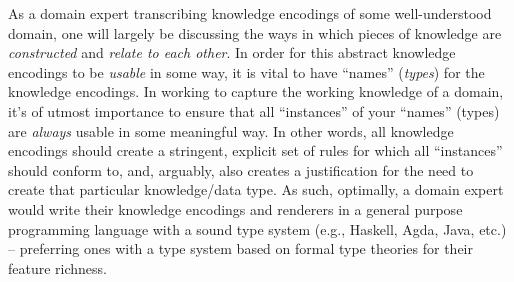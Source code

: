 
As a domain expert transcribing knowledge encodings of some well-understood
domain, one will largely be discussing the ways in which pieces of knowledge are
\textit{constructed} and \textit{relate to each other}. In order for this
abstract knowledge encodings to be \textit{usable} in some way, it is vital to
have ``names'' (\textit{types}) for the knowledge encodings. In working to
capture the working knowledge of a domain, it's of utmost importance to ensure
that all ``instances'' of your ``names'' (types) are \textit{always} usable in
some meaningful way. In other words, all knowledge encodings should create a
stringent, explicit set of rules for which all ``instances'' should conform to,
and, arguably, also creates a justification for the need to create that
particular knowledge/data type. As such, optimally, a domain expert would write
their knowledge encodings and renderers in a general purpose programming
language with a sound type system (e.g., Haskell, Agda, Java, etc.) --
preferring ones with a type system based on formal type theories for their
feature richness.
